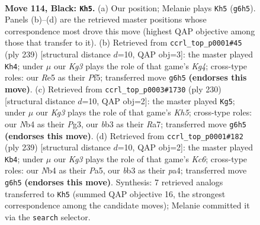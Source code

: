 \documentclass[11pt]{article}
\begin{document}
\clearpage

\begin{figure}[p]\centering
\begin{subfigure}{0.46\textwidth}\centering
\resizebox{\linewidth}{!}{%
\newchessgame
\chessboard[
  setfen={8/8/6k1/4r1p1/1n6/1B4K1/8/8 b - - 13 114},
  showmover=false,
  pgfstyle=straightmove, color=movearrow, markmove={g6-h5}
]}
\caption{}
\end{subfigure}\hfill
\begin{subfigure}{0.46\textwidth}\centering
\resizebox{\linewidth}{!}{%
\newchessgame
\chessboard[
  setfen={8/8/8/4npk1/5p2/8/5K2/3B4 b - - 51 120},
  showmover=false,
  pgfstyle=straightmove, color=movearrow, markmove={g5-h4}
]}
\caption{}
\end{subfigure}
\\[4pt]
\begin{subfigure}{0.46\textwidth}\centering
\resizebox{\linewidth}{!}{%
\newchessgame
\chessboard[
  setfen={6k1/R7/6P1/7K/8/6P1/8/1r6 w - - 1 116},
  showmover=false,
  pgfstyle=straightmove, color=movearrow, markmove={h5-g5}
]}
\caption{}
\end{subfigure}\hfill
\begin{subfigure}{0.46\textwidth}\centering
\resizebox{\linewidth}{!}{%
\newchessgame
\chessboard[
  setfen={8/8/7K/p7/P7/2k5/Bp6/8 b - - 1 120},
  showmover=false,
  pgfstyle=straightmove, color=movearrow, markmove={c3-b4}
]}
\caption{}
\end{subfigure}
\caption{\textbf{Move 114, Black: \texttt{Kh5}.} (a) Our position; Melanie plays \texttt{Kh5} (\texttt{g6h5}). Panels (b)--(d) are the retrieved master positions whose correspondence most drove this move (highest QAP objective among those that transfer to it). (b) Retrieved from \texttt{ccrl\_top\_p0001\#45} (ply 239) [structural distance $d$=10, QAP obj=3]: the master played \texttt{Kh4}; under $\mu$ our \emph{Kg3} plays the role of that game's \emph{Kg4}; cross-type roles: our \emph{R}e5 as their \emph{P}f5; transferred move \texttt{g6h5} \textbf{(endorses this move)}. (c) Retrieved from \texttt{ccrl\_top\_p0003\#1730} (ply 230) [structural distance $d$=10, QAP obj=2]: the master played \texttt{Kg5}; under $\mu$ our \emph{Kg3} plays the role of that game's \emph{Kh5}; cross-type roles: our \emph{N}b4 as their \emph{P}g3, our \emph{b}b3 as their \emph{R}a7; transferred move \texttt{g6h5} \textbf{(endorses this move)}. (d) Retrieved from \texttt{ccrl\_top\_p0001\#182} (ply 239) [structural distance $d$=10, QAP obj=2]: the master played \texttt{Kb4}; under $\mu$ our \emph{Kg3} plays the role of that game's \emph{Kc6}; cross-type roles: our \emph{N}b4 as their \emph{P}a5, our \emph{b}b3 as their \emph{p}a4; transferred move \texttt{g6h5} \textbf{(endorses this move)}. Synthesis: 7 retrieved analogs transferred to \texttt{Kh5} (summed QAP objective 16, the strongest correspondence among the candidate moves); Melanie committed it via the \texttt{search} selector.}
\label{fig:thought-m227}
\end{figure}
\end{document}
